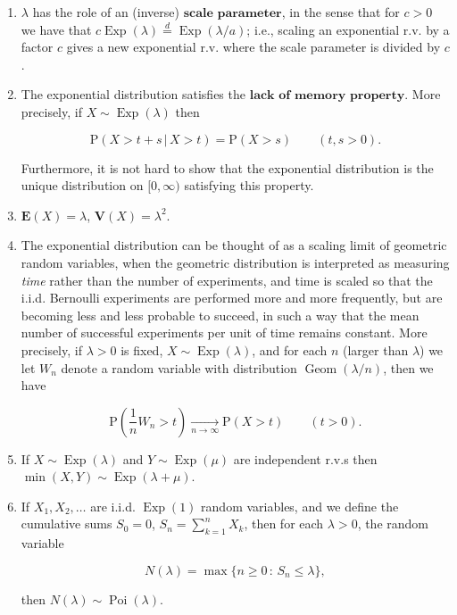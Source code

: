 \documentclass[11pt]{report}
\theoremstyle{plain}
\theoremstyle{definition}
\begin{document}
\begin{enumerate}[label=\arabic*.]
\item $\lambda$ has the role of an (inverse)
$\textbf{scale parameter}$, in the sense that for
$c>0$ we have that
$c \operatorname{Exp}(\lambda) \stackrel{d}{=}
\operatorname{Exp}(\lambda / a)$;
i.e., scaling an exponential r.v. by a factor $c$
gives a new exponential r.v. where the scale parameter
is divided by $c$.

\item The exponential distribution satisfies the
$\textbf{lack of memory property}$. More precisely,
if $X\sim \operatorname{Exp}(\lambda)$ then

\[
\mathrm{P}(X > t+s \,|\, X>t) = \mathrm{P}(X>s) \qquad (t,s>0).
\]

\noindent Furthermore, it is not hard to show that the
exponential distribution is the unique distribution on
$[0,\infty)$ satisfying this property.

\item $\mathbf{E}(X) = \lambda$,
$\mathbf{V}(X) = \lambda^2$.

\item The exponential distribution can be thought of as a
scaling limit of geometric random variables, when the
geometric distribution is interpreted as measuring
\emph{time} rather than the number of experiments, and time
is scaled so that the i.i.d. Bernoulli experiments are
performed more and more frequently, but are becoming
less and less probable to succeed, in such a way that
the mean number of successful experiments per unit of
time remains constant. More precisely, if $\lambda>0$
is fixed, $X\sim \operatorname{Exp}(\lambda)$, and
for each $n$ (larger than $\lambda$) we let $W_n$
denote a random variable with distribution
$\operatorname{Geom}(\lambda/n)$, then we have

\[
\mathrm{P}\left(\frac{1}{n} W_n > t\right)  \xrightarrow[n\to\infty]{} \mathrm{P}(X > t) \qquad (t>0).
\]

\item If $X\sim \operatorname{Exp}(\lambda)$ and
$Y \sim \operatorname{Exp}(\mu)$ are independent
r.v.s then
$\min(X,Y) \sim \operatorname{Exp}(\lambda+\mu)$.

\item If $X_1,X_2,\ldots$ are i.i.d. $\operatorname{Exp}(1)$
random variables, and we define the cumulative sums
$S_0=0$, $S_n = \sum_{k=1}^n X_k$, then for each
$\lambda>0$, the random variable

\[
N(\lambda) = \max\{ n\ge 0\,:\, S_n \le \lambda \},
\]

\noindent then $N(\lambda) \sim \operatorname{Poi}(\lambda)$.
\end{enumerate}
\end{document}

